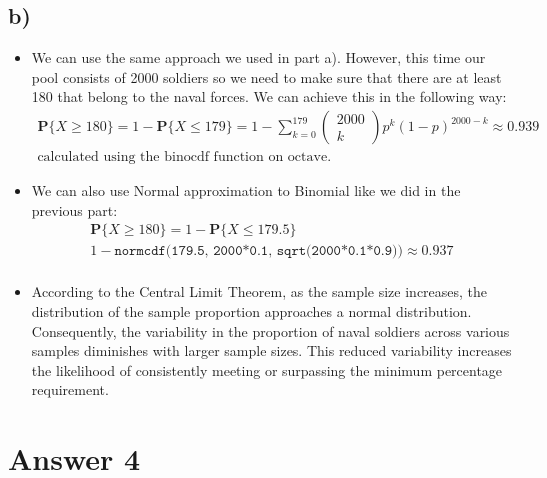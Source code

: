 \documentclass[12pt]{article}
\begin{document}
\subsection*{b)}
\begin{itemize}
    \item We can use the same approach we used in part a). However, this time our pool consists of 2000 soldiers so we need to make sure that there are at least 180 that belong to the naval forces. We can achieve this in the following way:
    \begin{equation*}
        \begin{split}
            \textbf{P}\{X \geq 180\} = 1 - \textbf{P}\{X \leq 179\} = 1 - \sum_{k = 0}^{179} \begin{pmatrix} 2000 \\ k \end{pmatrix} p^k(1-p)^{2000-k} \approx 0.939\\
            \text{calculated using the binocdf function on octave.}
        \end{split}
     \end{equation*}
     \item We can also use Normal approximation to Binomial like we did in the previous part:
     \begin{equation*}
        \begin{split}
            \textbf{P}\{X \geq 180\} = 1 - \textbf{P}\{X \leq 179.5\}\\ 
            1 - \texttt{normcdf(179.5, 2000*0.1, sqrt(2000*0.1*0.9))} \approx 0.937\\
        \end{split}
     \end{equation*}
     \item According to the Central Limit Theorem, as the sample size increases, the distribution of the sample proportion approaches a normal distribution. Consequently, the variability in the proportion of naval soldiers across various samples diminishes with larger sample sizes. This reduced variability increases the likelihood of consistently meeting or surpassing the minimum percentage requirement.
\end{itemize}


\section*{Answer 4}
\end{document}
